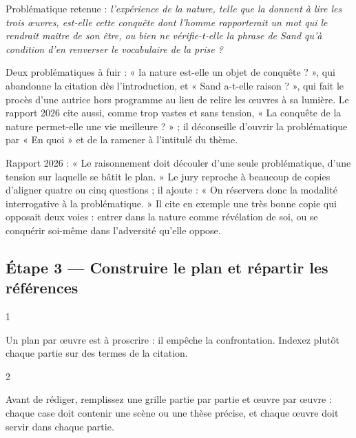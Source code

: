 \documentclass[11pt,a4paper]{article}
\begin{document}
Problématique retenue : \emph{l'expérience de la nature, telle que la donnent à lire les trois œuvres, est-elle cette conquête dont l'homme rapporterait un mot qui le rendrait maître de son être, ou bien ne vérifie-t-elle la phrase de Sand qu'à condition d'en renverser le vocabulaire de la prise ?}

\begin{piege}

Deux problématiques à fuir : « la nature est-elle un objet de conquête ? », qui abandonne la citation dès l'introduction, et « Sand a-t-elle raison ? », qui fait le procès d'une autrice hors programme au lieu de relire les œuvres à sa lumière. Le rapport 2026 cite aussi, comme trop vastes et sans tension, « La conquête de la nature permet-elle une vie meilleure ? » ; il déconseille d'ouvrir la problématique par « En quoi » et de la ramener à l'intitulé du thème.

\end{piege}

\begin{jury}

Rapport 2026 : « Le raisonnement doit découler d'une seule problématique, d'une tension sur laquelle se bâtit le plan. » Le jury reproche à beaucoup de copies d'aligner quatre ou cinq questions ; il ajoute : « On réservera donc la modalité interrogative à la problématique. » Il cite en exemple une très bonne copie qui opposait deux voies : entrer dans la nature comme révélation de soi, ou se conquérir soi-même dans l'adversité qu'elle oppose.

\end{jury}

\hypertarget{uxe9tape-3-construire-le-plan-et-ruxe9partir-les-ruxe9fuxe9rences}{%
\subsection{Étape 3 --- Construire le plan et répartir les références}\label{uxe9tape-3-construire-le-plan-et-ruxe9partir-les-ruxe9fuxe9rences}}

\begin{indication}{1}

Un plan par œuvre est à proscrire : il empêche la confrontation. Indexez plutôt chaque partie sur des termes de la citation.

\end{indication}

\begin{indication}{2}

Avant de rédiger, remplissez une grille partie par partie et œuvre par œuvre : chaque case doit contenir une scène ou une thèse précise, et chaque œuvre doit servir dans chaque partie.

\end{indication}
\end{document}
